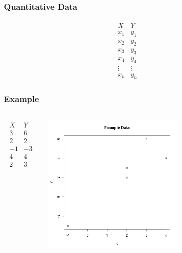 \begin{frame}
  \frametitle{Quantitative Data}

  \begin{eqnarray*}
    \begin{array}{l|l}
      X & Y \\ \hline
      x_1 & y_1 \\
      x_2 & y_2 \\
      x_3 & y_3 \\
      x_4 & y_4 \\
      \vdots & \vdots \\
      x_n & y_n
  \end{array}
\end{eqnarray*}

\end{frame}

\begin{frame}
  \frametitle{Example}

  \begin{columns}

  \begin{eqnarray*}
    \begin{array}{r|r}
      X & Y \\ \hline
      3 & 6 \\
      2 & 2 \\
      -1 & -3 \\
      4 & 4 \\
      2 & 3
    \end{array}
  \end{eqnarray*}



  {
    \includegraphics[width=7cm]{img/simpleBivariateExample}
  }


  \end{columns}


\end{frame}


